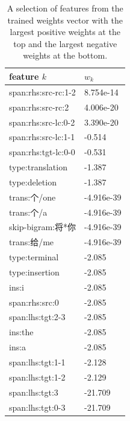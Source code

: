 \documentclass[11pt,a4paper]{article}
\begin{document}
\begin{table}

\begin{center}
\begin{CJK}{UTF8}{gbsn}
\small{
\begin{tabular}{ |l|l| } 
\hline
feature $k$ & $w_k$ \\ 
\hline
span:rhs:src-rc:1-2 &   8.754e-14 \\
span:rhs:src-rc:2   &   4.006e-20 \\
span:rhs:src-lc:0-2 &   3.390e-20 \\
span:rhs:src-lc:1-1 &   -0.514 \\
span:rhs:tgt-lc:0-0 &   -0.531 \\
type:translation    &   -1.387 \\
type:deletion       &   -1.387 \\
trans:个/one        &   -4.916e-39 \\
trans:个/a          &   -4.916e-39 \\
skip-bigram:将*你   &   -4.916e-39 \\
trans:给/me         &   -4.916e-39 \\
type:terminal       &   -2.085 \\
type:insertion      &   -2.085 \\
ins:i               &   -2.085 \\
span:rhs:src:0      &   -2.085 \\
span:lhs:tgt:2-3    &   -2.085 \\
ins:the             &   -2.085 \\
ins:a               &   -2.085 \\
span:lhs:tgt:1-1    &   -2.128 \\
span:lhs:tgt:1-2    &   -2.129 \\
span:lhs:tgt:3      &   -21.709 \\
span:lhs:tgt:0-3    &   -21.709 \\
\hline
\end{tabular}
}
\end{CJK}
\end{center}
\caption{A selection of features from the trained weights vector with the largest positive weights at the top and the largest negative weights at the bottom.}
\label{table:features}
\end{table}




\end{document}
